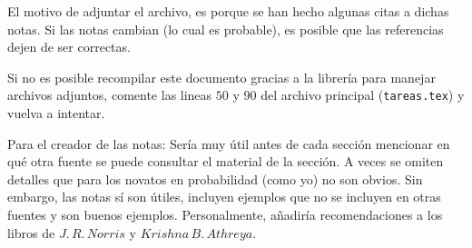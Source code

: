 \documentclass[a5paper,oneside]{amsart}
\theoremstyle{definition}
\numberwithin{section}{part}
\numberwithin{equation}{subsection}
\begin{document}
        El motivo de adjuntar el archivo, es porque se han hecho algunas citas a dichas notas. Si las notas cambian (lo cual es probable), 
        es posible que las referencias dejen de ser correctas.\pn
        
        Si no es posible recompilar este documento gracias a la librería para manejar archivos adjuntos, comente las lineas $50$ y $90$ del archivo 
        principal (\texttt{tareas.tex}) y vuelva a intentar.\pn
        
        Para el creador de las notas: Sería muy útil antes de cada sección mencionar en qué otra fuente se puede consultar el material de
        la sección. A veces se omiten detalles que para los novatos en probabilidad (como yo) no son obvios. Sin embargo, las notas sí son útiles,
        incluyen ejemplos que no se incluyen en otras fuentes y son buenos ejemplos. Personalmente, añadiría recomendaciones a los libros de 
        $J.\,R.\,Norris$ y $Krishna\,B.\,Athreya$.
\end{document}
